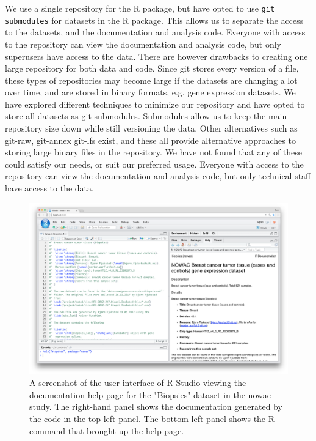 We use a single repository for the R package, but have opted to use \texttt{git
submodules} for datasets in the R package.  This allows us to separate the
access to the datasets, and the documentation and analysis code. Everyone with
access to the repository can view the documentation and analysis code, but only
superusers have access to the data.  There are however drawbacks to creating one
large repository for both data and code. Since git stores every version of a
file, these types of repositories may become large if the datasets are changing
a lot over time, and are stored in binary formats, e.g. gene expression
datasets. We have explored different techniques to minimize our repository and
have opted to store all datasets as git submodules\cite{submodule}. Submodules
allow us to keep the main repository size down while still versioning the data.
Other alternatives such as git-raw\cite{gitraw}, git-annex\cite{gitannex}
git-lfs\cite{gitlfs} exist, and these all provide alternative approaches to
storing large binary files in the repository. We have not found that any of
these could satisfy our needs, or suit our preferred usage.  Everyone with
access to the repository can view the documentation and analysis code, but only
technical staff have access to the data.

\begin{figure}
  \includegraphics[width=\linewidth]{figures/rpkg.png}
    \caption[A screenshot of the user interface of R Studio.]{A screenshot of
    the user interface of R Studio viewing the documentation help page for the
    "Biopsies" dataset in the \gls{nowac} study.  The right-hand panel shows the
    documentation generated by the code in the top left panel. The bottom left
    panel shows the R command that brought up the help page.}
    \label{rpkgfig} 
\end{figure}

